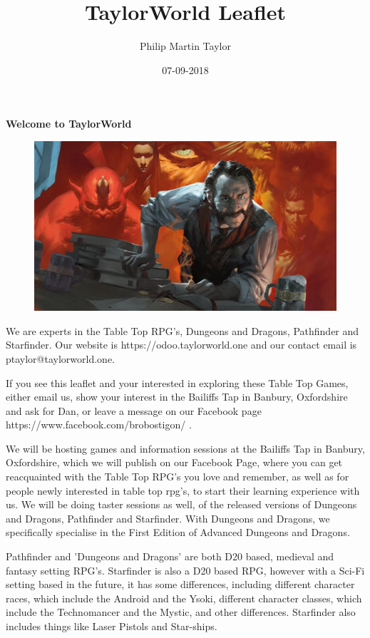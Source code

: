 \documentclass[12pt]{extreport}
\date{07-09-2018}
\author{Philip Martin Taylor}
\title{TaylorWorld Leaflet}
\begin{document}
 
\begin{center} 
\textbf{Welcome to TaylorWorld\texttrademark} 
\end{center} 
\begin{figure}[h]
  \centering
  \includegraphics[scale=0.15]{alchemist.jpg}
\end{figure}
\begin{flushleft} We are experts in the Table Top RPG's, Dungeons and Dragons, Pathfinder and Starfinder. Our website is https://odoo.taylorworld.one and our contact email is ptaylor@taylorworld.one. 
\end{flushleft} 
\begin{flushleft}
  If you see this leaflet and your interested in exploring these Table Top Games, either email us, show your interest in the Bailiffs Tap in Banbury, Oxfordshire and ask for Dan, or leave a message on our Facebook page https://www.facebook.com/brobostigon/ . 
\end{flushleft} 
\begin{flushleft}
 We will be hosting games and information sessions at the Bailiffs Tap in Banbury, Oxfordshire, which we will publish on our Facebook Page, where you can get reacquainted with the Table Top RPG's you love and remember, as well as for people newly interested in table top rpg's, to start their learning experience with us. We will be doing taster sessions as well, of the released versions of Dungeons and Dragons, Pathfinder and Starfinder. With Dungeons and Dragons, we specifically specialise in the First Edition of Advanced Dungeons and Dragons.
\end{flushleft} 
\begin{flushleft}
  Pathfinder and 'Dungeons and Dragons' are both D20 based, medieval and fantasy setting RPG's. Starfinder is also a D20 based RPG, however with a Sci-Fi setting based in the future, it has some differences, including different character races, which include the Android and the Ysoki, different character classes, which include the Technomancer and the Mystic, and other differences. Starfinder also includes things like Laser Pistols and Star-ships. 
\end{flushleft} 
\end{document}
